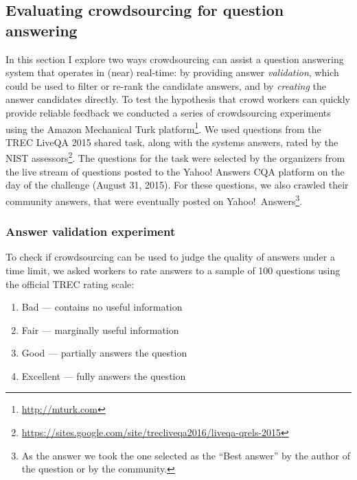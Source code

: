 \subsection{Evaluating crowdsourcing for question answering}
\label{section:non-factoid:crowdsourcing:approach}

In this section I explore two ways crowdsourcing can assist a question answering system that operates in (near) real-time: by providing answer \textit{validation}, which could be used to filter or re-rank the candidate answers, and by \textit{creating} the answer candidates directly.
To test the hypothesis that crowd workers can quickly provide reliable feedback we conducted a series of crowdsourcing experiments using the Amazon Mechanical Turk platform\footnote{\href{url}{http://mturk.com}}.
We used questions from the TREC LiveQA 2015 shared task, along with the systems answers, rated by the NIST assessors\footnote{\href{url}{https://sites.google.com/site/trecliveqa2016/liveqa-qrels-2015}}.
The questions for the task were selected by the organizers from the live stream of questions posted to the Yahoo! Answers CQA platform on the day of the challenge (August 31, 2015).
For these questions, we also crawled their community answers, that were eventually posted on Yahoo!~Answers\footnote{As the answer we took the one selected as the ``Best answer'' by the author of the question or by the community.}.

\subsubsection{Answer validation experiment}
\label{section:non-factoid:crowdsourcing:approach:validation}

To check if crowdsourcing can be used to judge the quality of answers under a time limit, we asked workers to rate answers to a sample of 100 questions using the official TREC rating scale:
\begin{enumerate}[itemsep=0em]
\item Bad --- contains no useful information
\item Fair --- marginally useful information
\item Good --- partially answers the question
\item Excellent --- fully answers the question
\end{enumerate}

